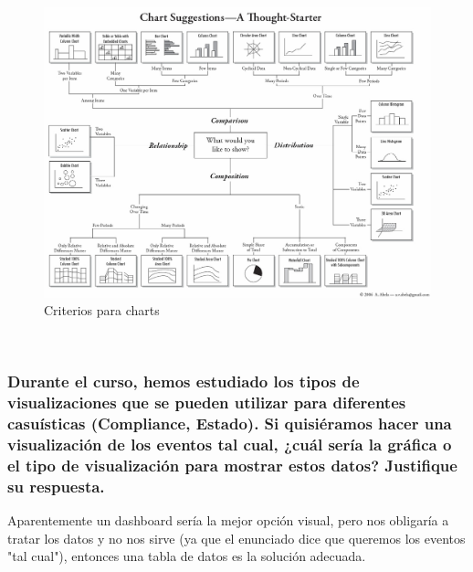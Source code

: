 \documentclass[12pt,twoside]{article}
\begin{document}
\begin{figure}[h]
    \centering
    \includegraphics[scale=0.4]{./imagenes/VB2010-01-29A}
    \caption{Criterios para charts}
\end{figure}\\



\subsubsection*{Durante el curso, hemos estudiado los tipos de visualizaciones que se pueden utilizar para diferentes casuísticas (Compliance, Estado). Si quisiéramos hacer una visualización de los eventos tal cual, ¿cuál sería la gráfica o el tipo de visualización para mostrar estos datos? Justifique su respuesta.}

Aparentemente un dashboard sería la mejor opción visual, pero nos obligaría a tratar los datos y no nos sirve (ya que el enunciado dice que queremos los eventos "tal cual"), entonces una tabla de datos es la solución adecuada. 
\end{document}
